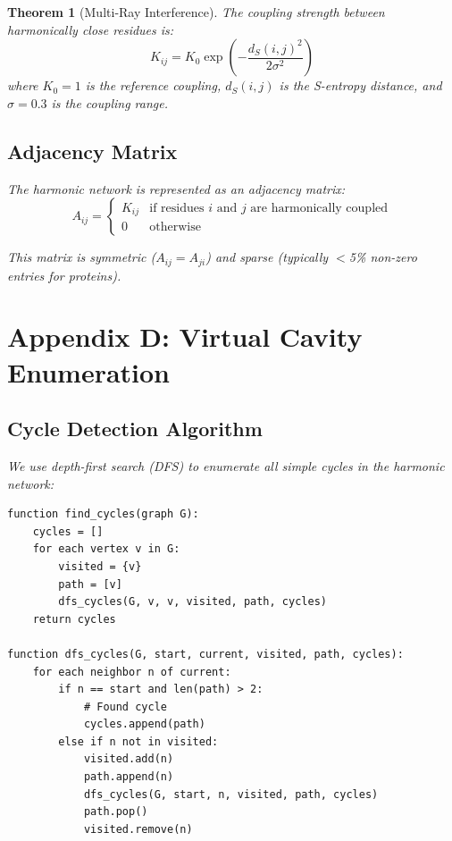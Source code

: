 \documentclass[11pt,a4paper]{article}
\newtheorem{theorem}{Theorem}[section]
\begin{document}
\begin{theorem}[Multi-Ray Interference]
The coupling strength between harmonically close residues is:
\begin{equation}
K_{ij} = K_0 \exp\left(-\frac{d_S(i,j)^2}{2\sigma^2}\right)
\end{equation}
where $K_0 = 1$ is the reference coupling, $d_S(i,j)$ is the S-entropy distance, and $\sigma = 0.3$ is the coupling range.

\subsection{Adjacency Matrix}

The harmonic network is represented as an adjacency matrix:
\begin{equation}
A_{ij} = \begin{cases}
K_{ij} & \text{if residues } i \text{ and } j \text{ are harmonically coupled} \\
0 & \text{otherwise}
\end{cases}
\end{equation}

This matrix is symmetric ($A_{ij} = A_{ji}$) and sparse (typically $<$5\% non-zero entries for proteins).

\section{Appendix D: Virtual Cavity Enumeration}

\subsection{Cycle Detection Algorithm}

We use depth-first search (DFS) to enumerate all simple cycles in the harmonic network:

\begin{verbatim}
function find_cycles(graph G):
    cycles = []
    for each vertex v in G:
        visited = {v}
        path = [v]
        dfs_cycles(G, v, v, visited, path, cycles)
    return cycles

function dfs_cycles(G, start, current, visited, path, cycles):
    for each neighbor n of current:
        if n == start and len(path) > 2:
            # Found cycle
            cycles.append(path)
        else if n not in visited:
            visited.add(n)
            path.append(n)
            dfs_cycles(G, start, n, visited, path, cycles)
            path.pop()
            visited.remove(n)
\end{verbatim}


\end{theorem}
\end{document}
